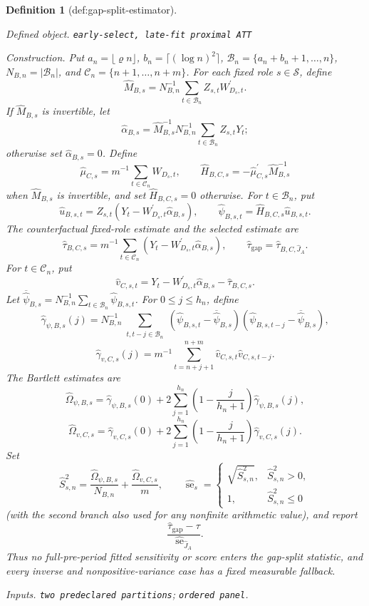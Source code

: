 \documentclass{article}
\newtheorem{definition}{Definition}
\begin{document}
\begin{definition}[def:gap-split-estimator]\label{def:gap-split-estimator}
\par\smallskip\noindent\emph{Defined object.} \texttt{early-\allowbreak{}select,\allowbreak{} late-\allowbreak{}fit proximal ATT}
\par\smallskip\noindent\emph{Construction.} Put \(a_n=\lfloor\varrho n\rfloor\), \(b_n=\lceil(\log n)^2\rceil\), \(\mathcal B_n=\{a_n+b_n+1,\ldots,n\}\), \(N_{B,n}=|\mathcal B_n|\), and \(\mathcal C_n=\{n+1,\ldots,n+m\}\).  For each fixed role \(s\in\mathcal S\), define
\[
 \widehat M_{B,s}=N_{B,n}^{-1}\sum_{t\in\mathcal B_n}Z_{s,t}W_{D_s,t}^{\prime}.
\]
If \(\widehat M_{B,s}\) is invertible, let
\[
 \widehat\alpha_{B,s}
 =\widehat M_{B,s}^{-1}N_{B,n}^{-1}
   \sum_{t\in\mathcal B_n}Z_{s,t}Y_t;
\]
otherwise set \(\widehat\alpha_{B,s}=0\).  Define
\[
 \widehat\mu_{C,s}=m^{-1}\sum_{t\in\mathcal C_n}W_{D_s,t},
 \qquad
 \widehat H_{B,C,s}=-\widehat\mu_{C,s}^{\prime}\widehat M_{B,s}^{-1}
\]
when \(\widehat M_{B,s}\) is invertible, and set \(\widehat H_{B,C,s}=0\) otherwise.  For \(t\in\mathcal B_n\), put
\[
 \widehat u_{B,s,t}=Z_{s,t}
  (Y_t-W_{D_s,t}^{\prime}\widehat\alpha_{B,s}),
 \qquad
 \widehat\psi_{B,s,t}=\widehat H_{B,C,s}\widehat u_{B,s,t}.
\]
The counterfactual fixed-role estimate and the selected estimate are
\[
 \widehat\tau_{B,C,s}=m^{-1}\sum_{t\in\mathcal C_n}
 (Y_t-W_{D_s,t}^{\prime}\widehat\alpha_{B,s}),
 \qquad
 \widehat\tau_{\mathrm{gap}}=\widehat\tau_{B,C,\widehat J_A}.
\]
For \(t\in\mathcal C_n\), put
\[
 \widehat v_{C,s,t}=Y_t-W_{D_s,t}^{\prime}\widehat\alpha_{B,s}
 -\widehat\tau_{B,C,s}.
\]
Let \(\overline{\widehat\psi}_{B,s}=N_{B,n}^{-1}\sum_{t\in\mathcal B_n}\widehat\psi_{B,s,t}\).  For \(0\leq j\leq h_n\), define
\[
 \widehat\gamma_{\psi,B,s}(j)=N_{B,n}^{-1}
 \sum_{\substack{t,t-j\in\mathcal B_n}}
 (\widehat\psi_{B,s,t}-\overline{\widehat\psi}_{B,s})
 (\widehat\psi_{B,s,t-j}-\overline{\widehat\psi}_{B,s}),
\]
\[
 \widehat\gamma_{v,C,s}(j)=m^{-1}
 \sum_{t=n+j+1}^{n+m}\widehat v_{C,s,t}\widehat v_{C,s,t-j}.
\]
The Bartlett estimates are
\[
 \widehat\Omega_{\psi,B,s}=\widehat\gamma_{\psi,B,s}(0)
 +2\sum_{j=1}^{h_n}\left(1-\frac{j}{h_n+1}\right)
 \widehat\gamma_{\psi,B,s}(j),
\]
\[
 \widehat\Omega_{v,C,s}=\widehat\gamma_{v,C,s}(0)
 +2\sum_{j=1}^{h_n}\left(1-\frac{j}{h_n+1}\right)
 \widehat\gamma_{v,C,s}(j).
\]
Set
\[
 \widehat S_{s,n}^2
 =\frac{\widehat\Omega_{\psi,B,s}}{N_{B,n}}
  +\frac{\widehat\Omega_{v,C,s}}m,
 \qquad
 \widehat{\operatorname{se}}_s=
 \begin{cases}
  \sqrt{\widehat S_{s,n}^2},&\widehat S_{s,n}^2>0,\\
  1,&\widehat S_{s,n}^2\leq0
 \end{cases}
\]
(with the second branch also used for any nonfinite arithmetic value), and report
\[
 \frac{\widehat\tau_{\mathrm{gap}}-\tau}
 {\widehat{\operatorname{se}}_{\widehat J_A}}.
\]
Thus no full-pre-period fitted sensitivity or score enters the gap-split statistic, and every inverse and nonpositive-variance case has a fixed measurable fallback.
\par\smallskip\noindent\emph{Inputs.} \texttt{two predeclared partitions}; \texttt{ordered panel}.
\end{definition}
\end{document}
